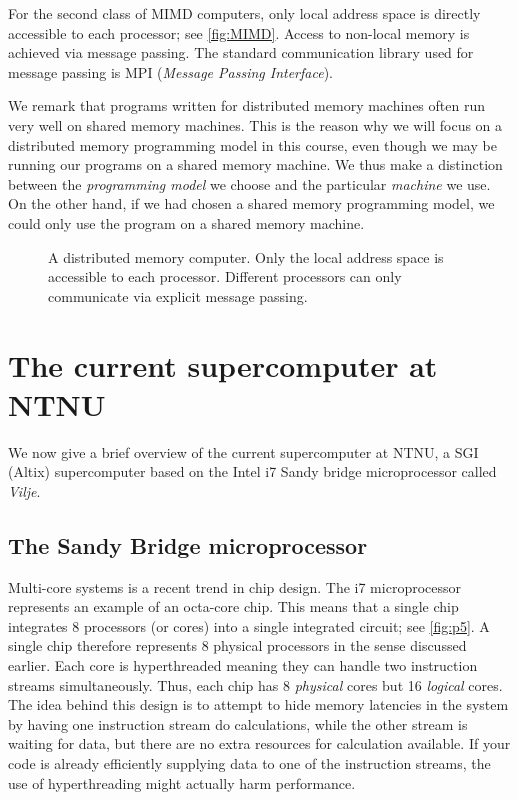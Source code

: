 For the second class of MIMD computers, only local address space is directly
accessible to each processor; see \autoref{fig:MIMD}. Access to non-local memory
is achieved via message passing. The standard communication library used for
message passing is MPI (\emph{Message Passing Interface}).

We remark that programs written for distributed memory machines often run very
well on shared memory machines. This is the reason why we will focus on a
distributed memory programming model in this course, even though we may be
running our programs on a shared memory machine. We thus make a distinction
between the \emph{programming model} we choose and the particular \emph
{machine} we use. On the other hand, if we had chosen a shared memory
programming model, we could only use the program on a shared memory machine.

\begin{figure}
  \centering
  
  \caption{
    A distributed memory computer. Only the local address space is accessible to
    each processor. Different processors can only communicate via explicit
    message passing.
  }
  \label{fig:MIMD}
\end{figure}

\section{The current supercomputer at NTNU}

We now give a brief overview of the current supercomputer at NTNU, a SGI (Altix)
supercomputer based on the Intel i7 Sandy bridge microprocessor called
\emph{Vilje}.

\subsection{The Sandy Bridge microprocessor}

Multi-core systems is a recent trend in chip design. The i7 microprocessor
represents an example of an octa-core chip. This means that a single chip
integrates 8 processors (or cores) into a single integrated circuit; see
\autoref{fig:p5}. A single chip therefore represents 8 physical processors in
the sense discussed earlier. Each core is hyperthreaded meaning they can handle
two instruction streams simultaneously. Thus, each chip has 8 \emph{physical}
cores but 16 \emph{logical} cores. The idea behind this design is to attempt to
hide memory latencies in the system by having one instruction stream do
calculations, while the other stream is waiting for data, but there are no extra
resources for calculation available. If your code is already efficiently
supplying data to one of the instruction streams, the use of hyperthreading
might actually harm performance.


